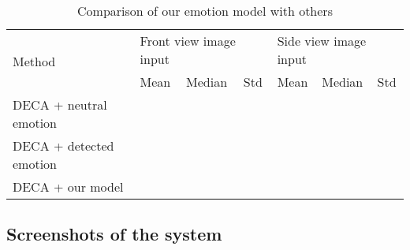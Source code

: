 \begin{table}[H]
    \centering
    \captionsetup{font=bf}
    \caption{Comparison of our emotion model with others}
    \begin{tabularx}{\linewidth}{|X|XXX|XXX|}
        \hline
        \multirow{2}{*}{Method} & \multicolumn{3}{l|}{Front view image input} & \multicolumn{3}{l|}{Side view image input}                                                                       \\ \cline{2-7}
                                & \multicolumn{1}{l|}{Mean}                   & \multicolumn{1}{l|}{Median}                & Std & \multicolumn{1}{l|}{Mean} & \multicolumn{1}{l|}{Median} & Std \\ \hline
        DECA + neutral emotion  & \multicolumn{1}{l|}{}                       & \multicolumn{1}{l|}{}                      &     & \multicolumn{1}{l|}{}     & \multicolumn{1}{l|}{}       &     \\ \hline
        DECA + detected emotion & \multicolumn{1}{l|}{}                       & \multicolumn{1}{l|}{}                      &     & \multicolumn{1}{l|}{}     & \multicolumn{1}{l|}{}       &     \\ \hline
        DECA + our model        & \multicolumn{1}{l|}{}                       & \multicolumn{1}{l|}{}                      &     & \multicolumn{1}{l|}{}     & \multicolumn{1}{l|}{}       &     \\ \hline
    \end{tabularx}
    \label{now_results}
\end{table}


\subsection{Screenshots of the system}